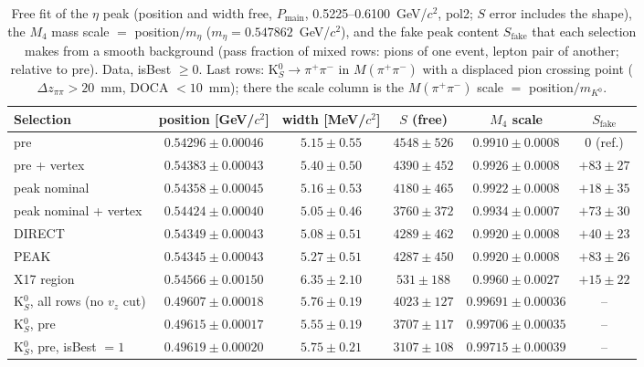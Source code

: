 \begin{table}[H]
\centering\footnotesize
\setlength{\tabcolsep}{3pt}
\caption{Free fit of the $\eta$ peak (position and width free, $P_\mathrm{main}$, 0.5225--0.6100~GeV/$c^2$, pol2; $S$ error includes the shape), the $M_4$ mass scale $=$ position$/m_\eta$ ($m_\eta=0.547862$~GeV/$c^2$), and the fake peak content $S_\mathrm{fake}$ that each selection makes from a smooth background (pass fraction of mixed rows: pions of one event, lepton pair of another; relative to pre). Data, isBest $\geq0$. Last rows: K$^0_S\to\pi^+\pi^-$ in $M(\pi^+\pi^-)$ with a displaced pion crossing point ($\Delta z_{\pi\pi}>20$~mm, DOCA $<10$~mm); there the scale column is the $M(\pi^+\pi^-)$ scale $=$ position$/m_{K^0}$.}
\label{tab:res_scale}
\begin{tabular}{lccccc}
\toprule
Selection & position [GeV/$c^2$] & width [MeV/$c^2$] & $S$ (free) & $M_4$ scale & $S_\mathrm{fake}$ \\
\midrule
pre & $0.54296\pm0.00046$ & $5.15\pm0.55$ & $4548\pm526$ & $0.9910\pm0.0008$ & 0 (ref.) \\
pre + vertex & $0.54383\pm0.00043$ & $5.40\pm0.50$ & $4390\pm452$ & $0.9926\pm0.0008$ & $+83\pm27$ \\
peak nominal & $0.54358\pm0.00045$ & $5.16\pm0.53$ & $4180\pm465$ & $0.9922\pm0.0008$ & $+18\pm35$ \\
peak nominal + vertex & $0.54424\pm0.00040$ & $5.05\pm0.46$ & $3760\pm372$ & $0.9934\pm0.0007$ & $+73\pm30$ \\
DIRECT & $0.54349\pm0.00043$ & $5.08\pm0.51$ & $4289\pm462$ & $0.9920\pm0.0008$ & $+40\pm23$ \\
PEAK & $0.54345\pm0.00043$ & $5.27\pm0.51$ & $4287\pm450$ & $0.9920\pm0.0008$ & $+83\pm26$ \\
X17 region & $0.54566\pm0.00150$ & $6.35\pm2.10$ & $531\pm188$ & $0.9960\pm0.0027$ & $+15\pm22$ \\
\midrule
K$^0_S$, all rows (no $v_z$ cut) & $0.49607\pm0.00018$ & $5.76\pm0.19$ & $4023\pm127$ & $0.99691\pm0.00036$ & -- \\
K$^0_S$, pre & $0.49615\pm0.00017$ & $5.55\pm0.19$ & $3707\pm117$ & $0.99706\pm0.00035$ & -- \\
K$^0_S$, pre, isBest $=1$ & $0.49619\pm0.00020$ & $5.75\pm0.21$ & $3107\pm108$ & $0.99715\pm0.00039$ & -- \\
\bottomrule
\end{tabular}
\end{table}
